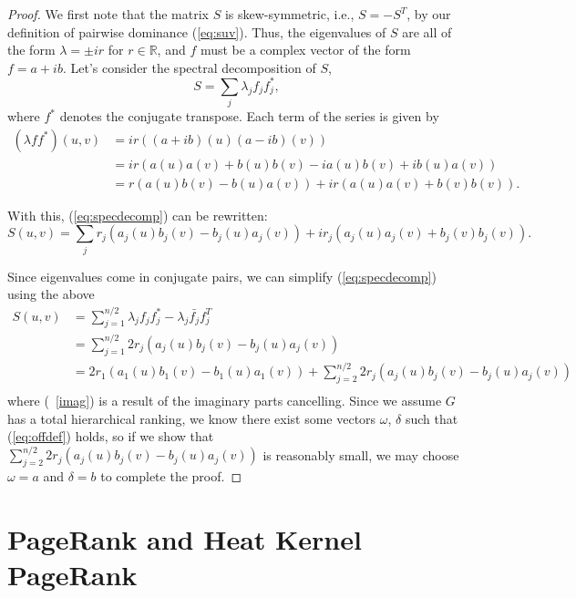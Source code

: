 \documentclass[a4,11pt,twoside,leqno]{report}
\theoremstyle{definition}
\theoremstyle{remark}
\numberwithin{equation}{section}
\newcommand{\R}{\mathbb{R}}
\begin{document}
\begin{proof}
We first note that the matrix $S$ is skew-symmetric, i.e., $S = -S^T$, by our
definition of pairwise dominance (\ref{eq:suv}).  Thus, the eigenvalues of $S$
are all of the form $\lambda = \pm ir$ for $r\in\R$, and $f$ must be a complex
vector of the form $f = a + ib$.  Let's consider the spectral decomposition of
$S$,
\begin{equation}\label{eq:specdecomp}
S = \sum_j \lambda_j f_jf_j^*,
\end{equation}
where $f^*$ denotes the conjugate transpose.  Each term of the series is given
by
\begin{align*}
(\lambda f f^*)(u,v) &= ir((a+ib)(u)(a-ib)(v))\\
&= ir(a(u)a(v) + b(u)b(v) - ia(u)b(v) + ib(u)a(v))\\
&= r(a(u)b(v) - b(u)a(v)) + ir(a(u)a(v) + b(v)b(v)).
\end{align*}

With this, (\ref{eq:specdecomp}) can be rewritten:
\begin{equation*}
S(u,v) = \sum_j r_j(a_j(u)b_j(v) - b_j(u)a_j(v)) + ir_j(a_j(u)a_j(v) +
b_j(v)b_j(v)).
\end{equation*}

Since eigenvalues come in conjugate pairs, we can simplify (\ref{eq:specdecomp})
using the above
\begin{align}
S(u,v) &= \sum_{j=1}^{n/2} \lambda_j f_jf_j^* - \lambda_j
\bar{f_j}f_j^T\nonumber\\
&= \sum_{j=1}^{n/2} 2r_j(a_j(u)b_j(v) - b_j(u)a_j(v))\label{imag}\\
&= 2r_1(a_1(u)b_1(v) - b_1(u)a_1(v)) + \sum_{j=2}^{n/2} 2r_j(a_j(u)b_j(v) -
b_j(u)a_j(v))\nonumber\\
\end{align}
where (~\ref{imag}) is a result of the imaginary parts cancelling.  Since we
assume $G$ has a total hierarchical ranking, we know there exist some vectors
$\omega$, $\delta$ such that (\ref{eq:offdef}) holds, so if we show that
$\sum_{j=2}^{n/2} 2r_j(a_j(u)b_j(v) - b_j(u)a_j(v))$ is reasonably small, we may
choose $\omega = a$ and $\delta = b$ to complete the proof.

\end{proof}

\chapter{PageRank and Heat Kernel PageRank}
\end{document}
